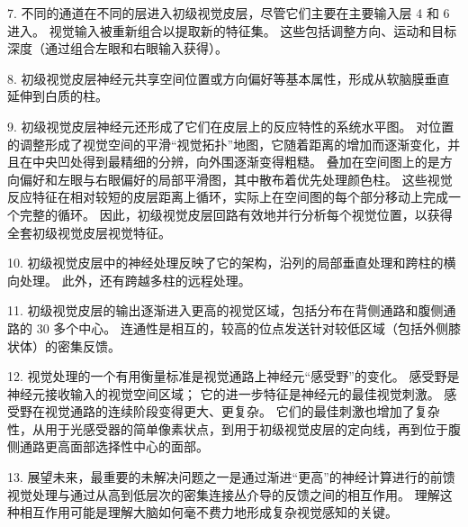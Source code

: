 7. 不同的通道在不同的层进入初级视觉皮层，尽管它们主要在主要输入层 4 和 6 进入。
视觉输入被重新组合以提取新的特征集。
这些包括调整方向、运动和目标深度（通过组合左眼和右眼输入获得）。
 

8. 初级视觉皮层神经元共享空间位置或方向偏好等基本属性，形成从软脑膜垂直延伸到白质的柱。
 


9. 初级视觉皮层神经元还形成了它们在皮层上的反应特性的系统水平图。
对位置的调整形成了视觉空间的平滑“视觉拓扑”地图，它随着距离的增加而逐渐变化，并且在中央凹处得到最精细的分辨，向外围逐渐变得粗糙。
叠加在空间图上的是方向偏好和左眼与右眼偏好的局部平滑图，其中散布着优先处理颜色柱。
这些视觉反应特征在相对较短的皮层距离上循环，实际上在空间图的每个部分移动上完成一个完整的循环。
因此，初级视觉皮层回路有效地并行分析每个视觉位置，以获得全套初级视觉皮层视觉特征。 


10. 初级视觉皮层中的神经处理反映了它的架构，沿列的局部垂直处理和跨柱的横向处理。
此外，还有跨越多柱的远程处理。


11. 初级视觉皮层的输出逐渐进入更高的视觉区域，包括分布在背侧通路和腹侧通路的 30 多个中心。
连通性是相互的，较高的位点发送针对较低区域（包括外侧膝状体）的密集反馈。 


12. 视觉处理的一个有用衡量标准是视觉通路上神经元“感受野”的变化。
感受野是神经元接收输入的视觉空间区域；
它的进一步特征是神经元的最佳视觉刺激。
感受野在视觉通路的连续阶段变得更大、更复杂。
它们的最佳刺激也增加了复杂性，从用于光感受器的简单像素状点，到用于初级视觉皮层的定向线，再到位于腹侧通路更高面部选择性中心的面部。


13. 展望未来，最重要的未解决问题之一是通过渐进“更高”的神经计算进行的前馈视觉处理与通过从高到低层次的密集连接丛介导的反馈之间的相互作用。
理解这种相互作用可能是理解大脑如何毫不费力地形成复杂视觉感知的关键。

